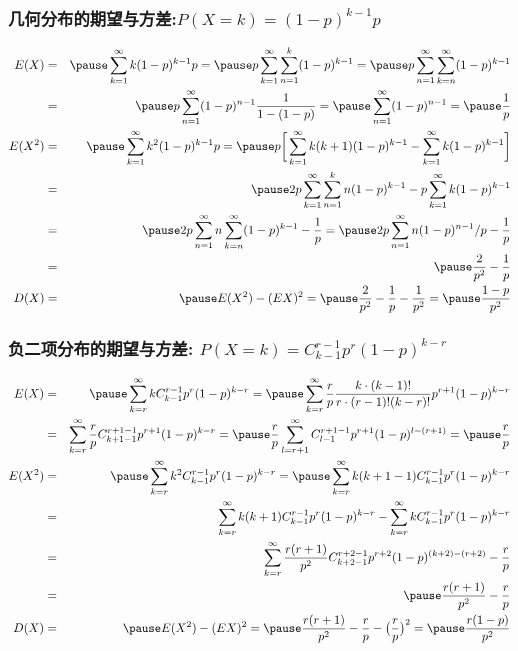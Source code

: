 	\begin{frame}
		\frametitle{几何分布的期望与方差:$P (X=k)=(1-p)^{k-1} p$}
		\vspace{-0.6cm}
		{\small \begin{eqnarray*}
				\hspace{-0.5cm} E(X)&=&\pause \sum_{k=1}^\infty k (1-p)^{k-1}p=\pause p\sum_{k=1}^\infty \sum_{n=1}^k(1-p)^{k-1}=\pause p\sum_{n=1}^\infty\sum_{k=n}^\infty (1-p)^{k-1}\\
				&=&\pause p\sum_{n=1}^\infty (1-p)^{n-1}\dfrac{1}{1-(1-p)}=\pause\sum_{n=1}^\infty (1-p)^{n-1}=\pause  \dfrac{1}{p}\\
				E(X^2)&=&\pause \sum_{k=1}^\infty k^2 (1-p)^{k-1}p=\pause p\bigg[\sum_{k=1}^\infty k(k+1)(1-p)^{k-1}-\sum_{k=1}^\infty k(1-p)^{k-1}\bigg]\\
				&=&\pause 2p\sum_{k=1}^\infty\sum_{n=1}^kn (1-p)^{k-1}-p\sum_{k=1}^\infty k (1-p)^{k-1}\\
				&=&\pause 2p\sum_{n=1}^\infty n\sum_{k=n}^\infty (1-p)^{k-1}-\dfrac{1}{p}=\pause 2p\sum_{n=1}^\infty n(1-p)^{n-1}/p-\dfrac{1}{p}\\
				&=&\pause \dfrac{2}{p^2}-\dfrac{1}{p}\\
				D(X)&=&\pause E(X^2)-(EX)^2=\pause \dfrac{2}{p^2}-\dfrac{1}{p}-\dfrac{1}{p^2}=\pause \dfrac{1-p}{p^2}
		\end{eqnarray*}}

	\end{frame}
	\begin{frame}
		\frametitle{负二项分布的期望与方差: $P (X=k)=C_{k-1}^{r-1} p^r (1-p)^{k-r}$}
		\vspace{-0.6cm}
		{\small \begin{eqnarray*}
				\hspace{-0.5cm} E(X)&=&\pause \sum_{k=r}^\infty k C_{k-1}^{r-1}p^r(1-p)^{k-r}=\pause \sum_{k=r}^\infty\dfrac{r}{p} \dfrac{k\cdot (k-1)!}{r\cdot (r-1)!(k-r)!}p^{r+1}(1-p)^{k-r}\\
				&=&\sum_{k=r}^\infty\dfrac{r}{p} C_{k+1-1}^{r+1-1}p^{r+1}(1-p)^{k-r}=\pause \dfrac{r}{p}\sum_{l=r+1}^\infty C_{l-1}^{r+1-1}p^{r+1}(1-p)^{l-(r+1)}=\pause \dfrac{r}{p}\\
				E(X^2)&=&\pause \sum_{k=r}^\infty k^2 C_{k-1}^{r-1}p^r(1-p)^{k-r}=\pause \sum_{k=r}^\infty k(k+1-1) C_{k-1}^{r-1}p^r(1-p)^{k-r}\\
				&=&\sum_{k=r}^\infty k(k+1) C_{k-1}^{r-1}p^r(1-p)^{k-r}-\sum_{k=r}^\infty k C_{k-1}^{r-1}p^r(1-p)^{k-r}\\
				&=&\sum_{k=r}^\infty\dfrac{r(r+1)}{p^2} C_{k+2-1}^{r+2-1}p^{r+2}(1-p)^{(k+2)-(r+2)}-\dfrac{r}{p}\\
				&=&\pause \dfrac{r(r+1)}{p^2}-\dfrac{r}{p}\\
				D(X)&=&\pause E(X^2)-(EX)^2=\pause \dfrac{r(r+1)}{p^2}-\dfrac{r}{p}-\big(\dfrac{r}{p}\big)^2=\pause \dfrac{r(1-p)}{p^2}
		\end{eqnarray*}}
	\end{frame}


